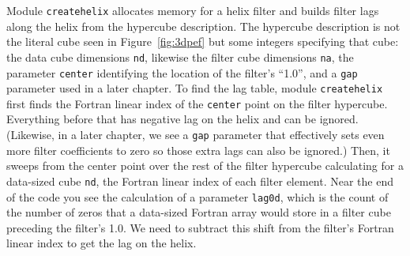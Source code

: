 %      

\par
Module
\texttt{createhelix} 
allocates memory for a helix filter and builds
filter lags along the helix from the hypercube description.
The hypercube description is not the literal cube
seen in Figure~\ref{fig:3dpef} but
some integers specifying that cube:
the data cube dimensions            \texttt{nd},
likewise the filter cube dimensions \texttt{na},
the parameter \texttt{center} identifying
the location of the filter's ``1.0'',
and a \texttt{gap} parameter used in a later chapter.
To find the lag table,
module \texttt{createhelix} %
first finds the
Fortran linear index of the \texttt{center} point on the filter hypercube.
Everything before that has negative lag on the helix and can be ignored.
(Likewise, in a later chapter, we see a \texttt{gap} parameter
that effectively sets even more filter coefficients to zero
so those extra lags can also be ignored.)
Then, it sweeps from the center point over the rest of the filter hypercube
calculating for a data-sized cube \texttt{nd},
the Fortran linear index of each filter element.
Near
the end of the code you see the calculation of a parameter \texttt{lag0d},
which is the count of the number of zeros that
a data-sized Fortran array would store
in a filter cube preceding the filter's 1.0.
We need to subtract this shift
from the filter's Fortran linear index to get the lag on the helix.

